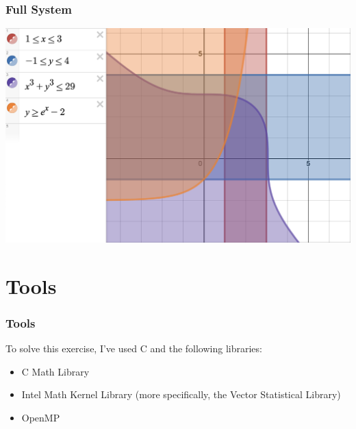 \documentclass{beamer}
\begin{document}
\begin{frame}
\frametitle{Full System}
\includegraphics[width=\textwidth,height=\textheight,keepaspectratio]{full_system.png}
\end{frame}

\section{Tools}
\begin{frame}
\frametitle{Tools}

To solve this exercise, I've used C and the following libraries:
\begin{itemize}
  \item C Math Library
  \item Intel Math Kernel Library (more specifically, the Vector Statistical Library)
  \item OpenMP
\end{itemize}
\end{frame}
\end{document}
